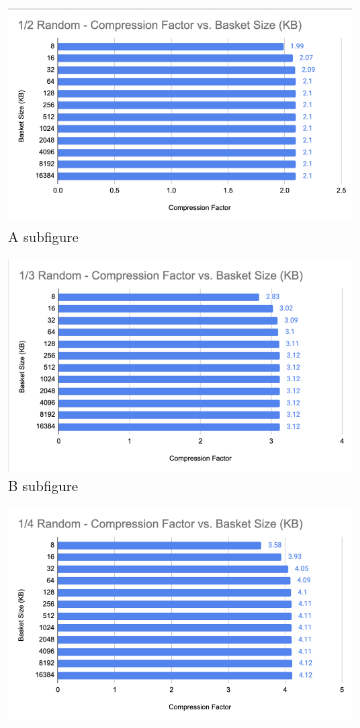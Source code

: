 \begin{figure}[h]
    \centering
    \begin{subfigure}{.5\textwidth}
        \centering
        \includegraphics[width=\textwidth]{content/toymodel_content/3.28/1_of_2.png}
        \caption{A subfigure}
        \label{fig:toymodel_328_compF_vs_basketsize_subA}
      \end{subfigure}%
      \begin{subfigure}{.5\textwidth}
        \centering
        \includegraphics[width=\textwidth]{content/toymodel_content/3.28/1_of_3.png}
        \caption{B subfigure}
        \label{fig:toymodel_328_compF_vs_basketsize_subB}
      \end{subfigure}%
      \linebreak
      \begin{subfigure}{.5\textwidth}
        \centering
        \includegraphics[width=\textwidth]{content/toymodel_content/3.28/1_of_4.png}

\end{subfigure}
\end{figure}
